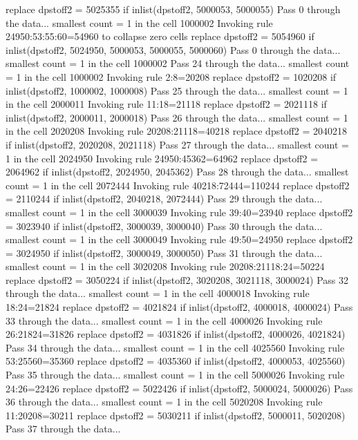   replace dpstoff2 = 5025355 if inlist(dpstoff2, 5000053, 5000055)
Pass 0 through the data...
  smallest count = 1 in the cell      1000002
  Invoking rule 24950:53:55:60=54960 to collapse zero cells
  replace dpstoff2 = 5054960 if inlist(dpstoff2, 5024950, 5000053, 5000055, 5000060)
Pass 0 through the data...
  smallest count = 1 in the cell      1000002
Pass 24 through the data...
  smallest count = 1 in the cell      1000002
  Invoking rule 2:8=20208
  replace dpstoff2 = 1020208 if inlist(dpstoff2, 1000002, 1000008)
Pass 25 through the data...
  smallest count = 1 in the cell      2000011
  Invoking rule 11:18=21118
  replace dpstoff2 = 2021118 if inlist(dpstoff2, 2000011, 2000018)
Pass 26 through the data...
  smallest count = 1 in the cell      2020208
  Invoking rule 20208:21118=40218
  replace dpstoff2 = 2040218 if inlist(dpstoff2, 2020208, 2021118)
Pass 27 through the data...
  smallest count = 1 in the cell      2024950
  Invoking rule 24950:45362=64962
  replace dpstoff2 = 2064962 if inlist(dpstoff2, 2024950, 2045362)
Pass 28 through the data...
  smallest count = 1 in the cell      2072444
  Invoking rule 40218:72444=110244
  replace dpstoff2 = 2110244 if inlist(dpstoff2, 2040218, 2072444)
Pass 29 through the data...
  smallest count = 1 in the cell      3000039
  Invoking rule 39:40=23940
  replace dpstoff2 = 3023940 if inlist(dpstoff2, 3000039, 3000040)
Pass 30 through the data...
  smallest count = 1 in the cell      3000049
  Invoking rule 49:50=24950
  replace dpstoff2 = 3024950 if inlist(dpstoff2, 3000049, 3000050)
Pass 31 through the data...
  smallest count = 1 in the cell      3020208
  Invoking rule 20208:21118:24=50224
  replace dpstoff2 = 3050224 if inlist(dpstoff2, 3020208, 3021118, 3000024)
Pass 32 through the data...
  smallest count = 1 in the cell      4000018
  Invoking rule 18:24=21824
  replace dpstoff2 = 4021824 if inlist(dpstoff2, 4000018, 4000024)
Pass 33 through the data...
  smallest count = 1 in the cell      4000026
  Invoking rule 26:21824=31826
  replace dpstoff2 = 4031826 if inlist(dpstoff2, 4000026, 4021824)
Pass 34 through the data...
  smallest count = 1 in the cell      4025560
  Invoking rule 53:25560=35360
  replace dpstoff2 = 4035360 if inlist(dpstoff2, 4000053, 4025560)
Pass 35 through the data...
  smallest count = 1 in the cell      5000026
  Invoking rule 24:26=22426
  replace dpstoff2 = 5022426 if inlist(dpstoff2, 5000024, 5000026)
Pass 36 through the data...
  smallest count = 1 in the cell      5020208
  Invoking rule 11:20208=30211
  replace dpstoff2 = 5030211 if inlist(dpstoff2, 5000011, 5020208)
Pass 37 through the data...
